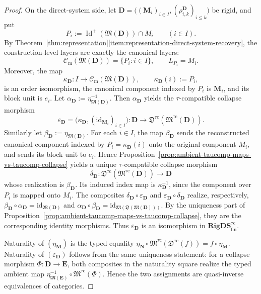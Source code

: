 \documentclass[pdflatex,sn-mathphys-num]{sn-jnl}
\theoremstyle{thmstyleone}%
\theoremstyle{thmstyletwo}%
\theoremstyle{thmstylethree}%
\newcommand{\PosId}{\operatorname{Id}^{+}}
\newcommand{\layer}[1]{L_{#1}}
\newcommand{\Cm}{\mathcal C_{\mathrm m}}
\begin{document}
\begin{proof}
On the direct-system side, let \(\mathbf D=\bigl((\mathbf M_i)_{i\in I},(\rho^{\mathbf D}_{i,k})_{i\le k}\bigr)\) be rigid, and put
\[
P_i:=\PosId(\mathfrak M(\mathbf D))\cap M_i
\qquad(i\in I).
\]
By Theorem~\ref{thm:representation}\ref{item:representation-direct-system-recovery}, the construction-level layers are exactly the canonical layers:
\[
\Cm(\mathfrak M(\mathbf D))=\{P_i:i\in I\},
\qquad
\layer{P_i}=M_i.
\]
Moreover, the map
\[
\kappa_{\mathbf D}\colon I\to \Cm(\mathfrak M(\mathbf D)),
\qquad
\kappa_{\mathbf D}(i):=P_i,
\]
is an order isomorphism, the canonical component indexed by \(P_i\) is \(\mathbf M_i\), and its block unit is \(e_i\).
Let \(\alpha_{\mathbf D}:=\eta_{\mathfrak M(\mathbf D)}^{-1}\).
Then \(\alpha_{\mathbf D}\) yields the \(\tau\)-compatible collapse morphism
\[
\varepsilon_{\mathbf D}
=
\bigl(\kappa_{\mathbf D},(\mathrm{id}_{\mathbf M_i})_{i\in I}\bigr)
\colon
\mathbf D\to
\mathfrak D^{\tau\mathrm{c}}(\mathfrak M^{\tau\mathrm{c}}(\mathbf D)).
\]
Similarly let \(\beta_{\mathbf D}:=\eta_{\mathfrak M(\mathbf D)}\).
For each \(i\in I\), the map \(\beta_{\mathbf D}\) sends the reconstructed canonical component indexed by \(P_i=\kappa_{\mathbf D}(i)\) onto the original component \(M_i\), and sends its block unit to \(e_i\).
Hence Proposition~\ref{prop:ambient-taucomp-maps-vs-taucomp-collapse} yields a unique \(\tau\)-compatible collapse morphism
\[
\delta_{\mathbf D}\colon
\mathfrak D^{\tau\mathrm{c}}(\mathfrak M^{\tau\mathrm{c}}(\mathbf D))
\to
\mathbf D
\]
whose realization is \(\beta_{\mathbf D}\).
Its induced index map is \(\kappa_{\mathbf D}^{-1}\), since the component over \(P_i\) is mapped onto \(M_i\).
The composites \(\delta_{\mathbf D}\circ\varepsilon_{\mathbf D}\) and \(\varepsilon_{\mathbf D}\circ\delta_{\mathbf D}\) realize, respectively, \(\beta_{\mathbf D}\circ\alpha_{\mathbf D}=\mathrm{id}_{\mathfrak M(\mathbf D)}\) and \(\alpha_{\mathbf D}\circ\beta_{\mathbf D} =\mathrm{id}_{\mathfrak M(\mathfrak D(\mathfrak M(\mathbf D)))}\).
By the uniqueness part of Proposition~\ref{prop:ambient-taucomp-maps-vs-taucomp-collapse}, they are the corresponding identity morphisms.
Thus \(\varepsilon_{\mathbf D}\) is an isomorphism in \(\mathbf{RigDS}^{\tau\mathrm{c}}_{\mathrm{fin}}\).

Naturality of \((\eta_{\mathbf M})\) is the typed equality \(\eta_{\mathbf N}\circ \mathfrak M^{\tau\mathrm{c}}(\mathfrak D^{\tau\mathrm{c}}(f)) =f\circ\eta_{\mathbf M}\).
Naturality of \((\varepsilon_{\mathbf D})\) follows from the same uniqueness statement: for a collapse morphism \(\Phi\colon\mathbf D\to\mathbf E\), both composites in the naturality square realize the typed ambient map \(\eta_{\mathfrak M(\mathbf E)}^{-1}\circ \mathfrak M^{\tau\mathrm{c}}(\Phi)\).
Hence the two assignments are quasi-inverse equivalences of categories.
\end{proof}
\end{document}
